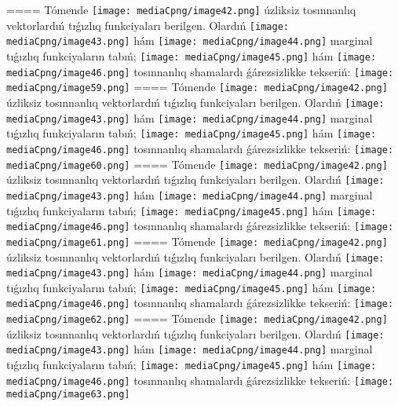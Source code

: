 ====
Tómende \texttt{[image: mediaCpng/image42.png]} úzliksiz tosınnanlıq vektorlardıń tıǵızlıq funkciyaları berilgen. Olardıń \texttt{[image: mediaCpng/image43.png]} hám \texttt{[image: mediaCpng/image44.png]} marginal tıǵızlıq funkciyaların tabıń; \texttt{[image: mediaCpng/image45.png]} hám \texttt{[image: mediaCpng/image46.png]} tosınnanlıq shamalardı ǵárezsizlikke tekseriń: \texttt{[image: mediaCpng/image59.png]}
====
Tómende \texttt{[image: mediaCpng/image42.png]} úzliksiz tosınnanlıq vektorlardıń tıǵızlıq funkciyaları berilgen. Olardıń \texttt{[image: mediaCpng/image43.png]} hám \texttt{[image: mediaCpng/image44.png]} marginal tıǵızlıq funkciyaların tabıń; \texttt{[image: mediaCpng/image45.png]} hám \texttt{[image: mediaCpng/image46.png]} tosınnanlıq shamalardı ǵárezsizlikke tekseriń: \texttt{[image: mediaCpng/image60.png]}
====
Tómende \texttt{[image: mediaCpng/image42.png]} úzliksiz tosınnanlıq vektorlardıń tıǵızlıq funkciyaları berilgen. Olardıń \texttt{[image: mediaCpng/image43.png]} hám \texttt{[image: mediaCpng/image44.png]} marginal tıǵızlıq funkciyaların tabıń; \texttt{[image: mediaCpng/image45.png]} hám \texttt{[image: mediaCpng/image46.png]} tosınnanlıq shamalardı ǵárezsizlikke tekseriń: \texttt{[image: mediaCpng/image61.png]}
====
Tómende \texttt{[image: mediaCpng/image42.png]} úzliksiz tosınnanlıq vektorlardıń tıǵızlıq funkciyaları berilgen. Olardıń \texttt{[image: mediaCpng/image43.png]} hám \texttt{[image: mediaCpng/image44.png]} marginal tıǵızlıq funkciyaların tabıń; \texttt{[image: mediaCpng/image45.png]} hám \texttt{[image: mediaCpng/image46.png]} tosınnanlıq shamalardı ǵárezsizlikke tekseriń: \texttt{[image: mediaCpng/image62.png]}
====
Tómende \texttt{[image: mediaCpng/image42.png]} úzliksiz tosınnanlıq vektorlardıń tıǵızlıq funkciyaları berilgen. Olardıń \texttt{[image: mediaCpng/image43.png]} hám \texttt{[image: mediaCpng/image44.png]} marginal tıǵızlıq funkciyaların tabıń; \texttt{[image: mediaCpng/image45.png]} hám \texttt{[image: mediaCpng/image46.png]} tosınnanlıq shamalardı ǵárezsizlikke tekseriń: \texttt{[image: mediaCpng/image63.png]}
